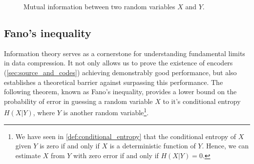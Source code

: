 \begin{figure}[h!]
    \centering
    \caption{Mutual information between two random variables $X$ and $Y$.\label{fig:mutual_information}}
\end{figure}

\subsection{Fano's inequality}

Information theory serves as a cornerstone for understanding fundamental limits in data compression. It not only allows us to prove the existence of encoders (\autoref{sec:source_and_codes}) achieving demonstrably good performance, but also establishes a theoretical barrier against surpassing this performance. The following theorem, known as Fano's inequality, provides a lower bound on the probability of error in guessing a random variable $X$ to it's conditional entropy $H(X|Y)$, where $Y$ is another random variable\footnote{We have seen in \ref{def:conditional_entropy} that the conditional entropy of $X$ given $Y$ is zero if and only if $X$ is a deterministic function of $Y$. Hence, we can estimate $X$ from $Y$ with zero error if and only if $H(X|Y) = 0$.}.


